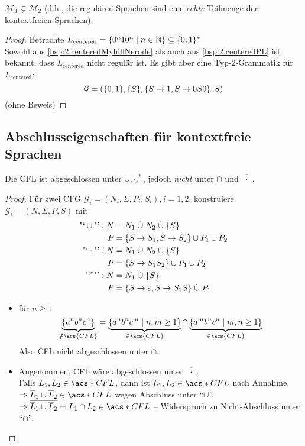 \begin{lemma}
	$\mathcal{M}_3 \subsetneq \mathcal{M}_2$ (d.h., die regulären Sprachen sind eine \emph{echte} Teilmenge der kontextfreien Sprachen).
\end{lemma}
\begin{proof}
	Betrachte $L_\text{centered}=\{0^n10^n \mid n\in\mathbb{N} \}\subseteq\{0,1\}^*$\\
	Sowohl aus \autoref{bsp:2.centeredMyhillNerode} als auch aus \autoref{bsp:2.centeredPL} ist bekannt, 
	dass $L_\text{centered}$ nicht regulär ist.
	Es gibt aber eine Typ-2-Grammatik für $L_\text{centered}$:
	\[ \mathcal{G} = (\{0,1\}, \{S\}, \{S\->1, S\->0S0 \}, S) \]
	(ohne Beweis)
\end{proof}


\subsection{Abschlusseigenschaften für kontextfreie Sprachen}


\begin{Satz} %
  \label{thm:cfl-closed-reg-intersect}
	Die \ac{CFL} ist abgeschlossen unter $\cup, \cdot, ^*$, jedoch \emph{nicht} unter $\cap$ und $\overline{\!\phantom{i}\cdot\!\phantom{i}}$.
\end{Satz}
\begin{proof}
	Für zwei \ac{CFG} $\mathcal{G}_i = (N_i, \Sigma,P_i,S_i), i=1,2$, konstruiere $\mathcal{G}_i = (N,\Sigma,P,S)$ mit
	\begin{align*}
		\text{"`}\cup\text{"'}: N &= N_1\dotcup N_2\dotcup\{S\}\\
		P &= \{S\->S_1, S\->S_2 \} \cup P_1\cup P_2\\
		\text{"`}\cdot\text{"'}: N &= N_1\dotcup N_2\dotcup\{S\}\\
		P &= \{ S\->S_1S_2 \} \cup P_1\cup P_2\\
		\text{"`}^*\text{"'}: N &= N_1 \dotcup \{S\}\\
		P &= \{ S\->\Eps, S\-> S_1S \} \dotcup P_1
	\end{align*}
	\begin{itemize}
	\item für $n\geq 1$
		\[ \underbrace{\{a^nb^nc^n\}}_{\notin \acs{CFL}} = \underbrace{\{a^nb^nc^m \mid n,m\geq 1 \}}_{\in \acs{CFL}} \cap \underbrace{\{a^mb^nc^n \mid m,n\geq 1 \}}_{\in \acs{CFL}} \]
		Also \ac{CFL} nicht abgeschlossen unter $\cap$.
	\item Angenommen, CFL wäre abgeschlossen unter $\overline{\!\phantom{i}\cdot\!\phantom{i}}$.\\
		Falls $L_1,L_2\in \acs*{CFL}$, dann ist $\overline{L}_1,\overline{L}_2\in\acs*{CFL}$ nach Annahme.\\
		$\Rightarrow \overline{L}_1\cup \overline{L}_2\in\acs*{CFL}$ wegen Abschluss unter "`$\cup$"'.\\
		$\Rightarrow \overline{\overline{L}_1\cup \overline{L}_2} = L_1\cap L_2\in\acs*{CFL}$ -- Widerspruch zu Nicht-Abschluss unter "`$\cap$"'. \qedhere
	\end{itemize}
\end{proof}





